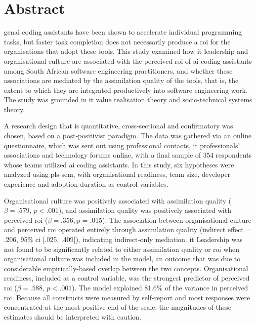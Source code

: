 \documentclass[11pt]{report}
\begin{document}
\maketitle

\chapter*{Abstract}
\gls{genai} coding assistants have been shown to accelerate individual programming tasks, but faster task completion does not necessarily produce a \gls{roi} for the organisations that adopt these tools. This study examined how \gls{it} leadership and organisational culture are associated with the perceived \gls{roi} of \gls{ai} coding assistants among South African software engineering practitioners, and whether these associations are mediated by the assimilation quality of the tools, that is, the extent to which they are integrated productively into software engineering work. The study was 
grounded in \gls{it} value realisation theory and socio-technical systems theory.

A research design that is quantitative, cross-sectional and confirmatory was chosen, based on a post-positivist paradigm. The data was gathered via an online questionnaire, which was sent out using professional contacts, \gls{it} professionals' associations and technology forums online, with a final sample of 354 respondents whose teams utilized \gls{ai} coding assistants. In this study, six hypotheses were analyzed using \gls{pls-sem}, with organisational readiness, team size, 
developer experience and adoption duration as control variables.

Organisational culture was positively associated with assimilation quality ($\beta = .579$, $p < .001$), and assimilation quality was positively associated with perceived \gls{roi} ($\beta = .356, $p = .015). The association between organisational culture and perceived \gls{roi} operated entirely through assimilation quality (indirect effect = .206, 95\% \gls{ci} [.025, .409]), indicating indirect-only mediation. \gls{it} Leadership was not found to be significantly related to either assimilation quality or \gls{roi} when organisational culture was included in the model, an outcome that was due to considerable empirically-based overlap between the two concepts. Organisational readiness, included as a control variable, was the strongest predictor of perceived \gls{roi} ($\beta = .588$, $p < .001$). The model explained 81.6\% of the variance in perceived \gls{roi}. Because all constructs were measured by self-report and most responses were concentrated at the most positive end of the scale, the magnitudes of these estimates should be interpreted with caution.
\end{document}
